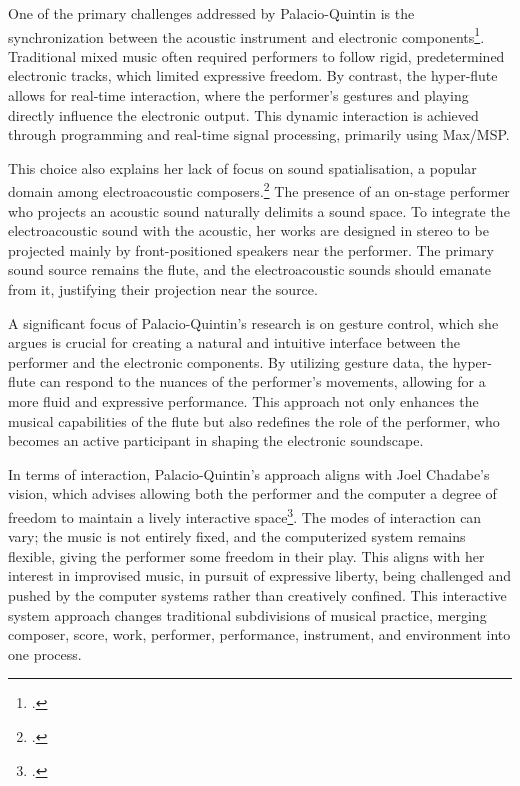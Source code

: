 \documentclass[12pt,twoside,maitrise]{dms_ks}
\theoremstyle{definition}
\begin{document}
{{One of the primary challenges addressed by Palacio-Quintin is the synchronization between the acoustic instrument and electronic components\footcite{palacio-quintin_composition_2012-1}. 
Traditional mixed music often required performers to follow rigid, predetermined electronic tracks, which limited expressive freedom. 
By contrast, the hyper-flute allows for real-time interaction, where the performer's gestures and playing directly influence the electronic output. 
This dynamic interaction is achieved through programming and real-time signal processing, primarily using Max/MSP.

This choice also explains her lack of focus on sound spatialisation, a popular domain among electroacoustic composers.\footcite[50]{palacio-quintin_composition_2012-1} 
The presence of an on-stage performer who projects an acoustic sound naturally delimits a sound space. 
To integrate the electroacoustic sound with the acoustic, her works are designed in stereo to be projected mainly by front-positioned speakers near the performer. 
The primary sound source remains the flute, and the electroacoustic sounds should emanate from it, justifying their projection near the source.

A significant focus of Palacio-Quintin's research is on gesture control, which she argues is crucial for creating a natural and intuitive interface between the performer and the electronic components. 
By utilizing gesture data, the hyper-flute can respond to the nuances of the performer's movements, allowing for a more fluid and expressive performance. 
This approach not only enhances the musical capabilities of the flute but also redefines the role of the performer, who becomes an active participant in shaping the electronic soundscape.

In terms of interaction, Palacio-Quintin’s approach aligns with Joel Chadabe's vision, which advises allowing both the performer and the computer a degree of freedom to maintain a lively interactive space\footcite[23]{chadabe_interactive_1984}. 
The modes of interaction can vary; the music is not entirely fixed, and the computerized system remains flexible, giving the performer some freedom in their play. 
This aligns with her interest in improvised music, in pursuit of expressive liberty, being challenged and pushed by the computer systems rather than creatively confined. 
This interactive system approach changes traditional subdivisions of musical practice, merging composer, score, work, performer, performance, instrument, and environment into one process.

}}
\end{document}
